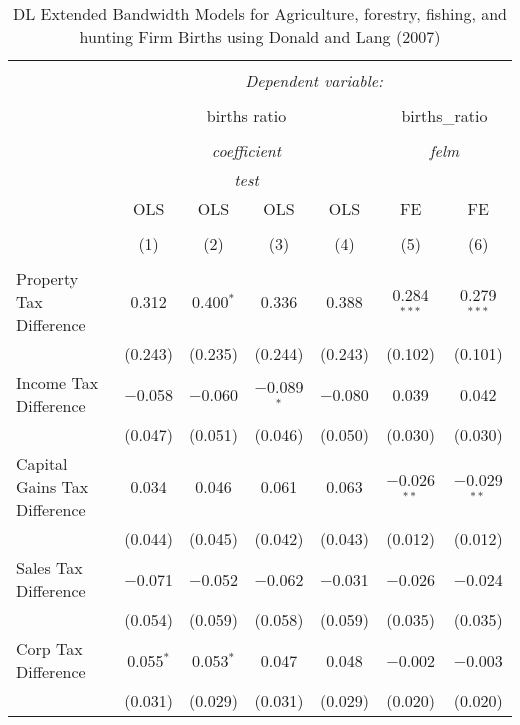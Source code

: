 
\begin{table}[!htbp] \centering 
  \caption{DL Extended Bandwidth Models for  Agriculture, forestry, fishing, and hunting Firm Births using Donald and Lang (2007)} 
  \label{} 
\begin{tabular}{@{\extracolsep{5pt}}lcccccc} 
\\[-1.8ex]\hline 
\hline \\[-1.8ex] 
 & \multicolumn{6}{c}{\textit{Dependent variable:}} \\ 
\cline{2-7} 
\\[-1.8ex] & \multicolumn{4}{c}{births ratio} & \multicolumn{2}{c}{births\_ratio} \\ 
\\[-1.8ex] & \multicolumn{4}{c}{\textit{coefficient}} & \multicolumn{2}{c}{\textit{felm}} \\ 
 & \multicolumn{4}{c}{\textit{test}} & \multicolumn{2}{c}{\textit{}} \\ 
 & OLS & OLS & OLS & OLS & FE & FE \\ 
\\[-1.8ex] & (1) & (2) & (3) & (4) & (5) & (6)\\ 
\hline \\[-1.8ex] 
 Property Tax Difference & 0.312 & 0.400$^{*}$ & 0.336 & 0.388 & 0.284$^{***}$ & 0.279$^{***}$ \\ 
  & (0.243) & (0.235) & (0.244) & (0.243) & (0.102) & (0.101) \\ 
  Income Tax Difference & $-$0.058 & $-$0.060 & $-$0.089$^{*}$ & $-$0.080 & 0.039 & 0.042 \\ 
  & (0.047) & (0.051) & (0.046) & (0.050) & (0.030) & (0.030) \\ 
  Capital Gains Tax Difference & 0.034 & 0.046 & 0.061 & 0.063 & $-$0.026$^{**}$ & $-$0.029$^{**}$ \\ 
  & (0.044) & (0.045) & (0.042) & (0.043) & (0.012) & (0.012) \\ 
  Sales Tax Difference & $-$0.071 & $-$0.052 & $-$0.062 & $-$0.031 & $-$0.026 & $-$0.024 \\ 
  & (0.054) & (0.059) & (0.058) & (0.059) & (0.035) & (0.035) \\ 
  Corp Tax Difference & 0.055$^{*}$ & 0.053$^{*}$ & 0.047 & 0.048 & $-$0.002 & $-$0.003 \\ 
  & (0.031) & (0.029) & (0.031) & (0.029) & (0.020) & (0.020) \\ 

\end{tabular}
\end{table}
